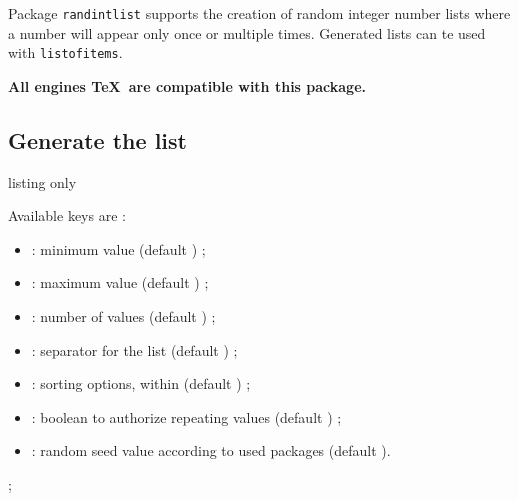 \documentclass[11pt,a4paper]{ltxdoc}
\begin{document}
Package \texttt{randintlist} supports the creation of random integer number lists where a number will appear only once or multiple times. Generated lists can te used with \texttt{listofitems}.

\hfill\textbf{All engines \TeX\ are compatible with this package.}\hfill~

\subsection{Generate the list}

\begin{DemoCode}{listing only}
\randintlist[keys]{\macro}
\end{DemoCode}

Available keys are :

\begin{itemize}
	\item {} : minimum value (default ) ;
	\item {} : maximum value (default ) ;
	\item {} : number of values (default ) ;
	\item {} : separator for the list (default \ShowCode{,}) ;
	\item {} : sorting options, within  (default ) ;
	\item {} : boolean to authorize repeating values (default ) ;
	\item {} : random seed value according to used packages (default \ShowCode{-}).
\end{itemize}

\begin{DemoCode}{}
\randintlist{\mylistA}\mylistA
\end{DemoCode}

\begin{DemoCode}{}
\randintlist[sort=asc,min=1,max=50,nb=10]{\mylistB}\mylistB
\end{DemoCode}

\begin{DemoCode}{}
\randintlist[sort=asc,min=1,max=50,nb=15,repeat]{\mylistC}\mylistC
\end{DemoCode}

\begin{DemoCode}{}
\randintlist{\mylistD}\mylistD\par
\readlist*\mylistused{\mylistD}\showitems{\mylistused}\par
\mylistused[1] ; \mylistused[-1]
\end{DemoCode}
\end{document}
